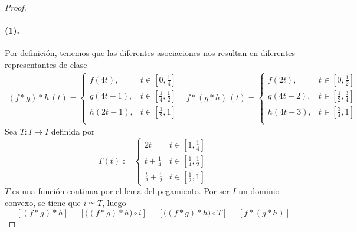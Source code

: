 \begin{proof}
\paragraph{(1).}
Por definición, tenemos que las diferentes asociaciones nos resultan en
diferentes representantes de clase
\[
  \begin{matrix}
    (f * g) * h \, (t) =
    \begin{cases}
      f (4t), & t \in [0, \frac 1 4] \\
      g (4t - 1), & t \in [\frac 1 4, \frac 1 2] \\
      h (2t - 1), & t \in [\frac 1 2, 1] \\
    \end{cases} &
    f * (g * h) \, (t) =
    \begin{cases}
      f (2t), & t \in [0, \frac 1 2] \\
      g (4t - 2), & t \in [\frac 1 2, \frac 3 4] \\
      h (4t - 3), & t \in [\frac 3 4, 1] \\
    \end{cases}
  \end{matrix}
\]
Sea \(T : I \to I\) definida por
\[ T (t) :=
  \begin{cases}
    2t & t \in [1 , \frac 1 4] \\
    t + \frac 1 4 & t \in [\frac 1 4, \frac 1 2] \\
    \frac t 2 + \frac 1 2 & t \in [\frac 1 2, 1]
  \end{cases}
\]
\(T\) es una función continua por el lema del pegamiento. Por ser \(I\)
un dominio convexo, se tiene que \(i \simeq T\), luego
\[ [(f * g) * h] = [\big( (f * g) * h \big) \circ i] = [\big( (f * g) *
  h \big) \circ T ] = [f * (g * h)] \]
\end{proof}
